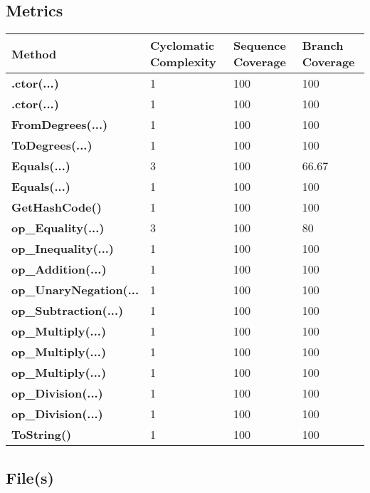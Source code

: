 \documentclass[a4paper,10pt]{article}
\begin{document}
\subsection{Metrics}
\begin{longtable}[l]{|l|l|l|l|}
\hline
\textbf{Method} & \textbf{Cyclomatic Complexity} & \textbf{Sequence Coverage} & \textbf{Branch Coverage}\\
\hline
\textbf{.ctor(...)} & 1 & 100 & 100\\
\hline
\textbf{.ctor(...)} & 1 & 100 & 100\\
\hline
\textbf{FromDegrees(...)} & 1 & 100 & 100\\
\hline
\textbf{ToDegrees(...)} & 1 & 100 & 100\\
\hline
\textbf{Equals(...)} & 3 & 100 & 66.67\\
\hline
\textbf{Equals(...)} & 1 & 100 & 100\\
\hline
\textbf{GetHashCode()} & 1 & 100 & 100\\
\hline
\textbf{op\_Equality(...)} & 3 & 100 & 80\\
\hline
\textbf{op\_Inequality(...)} & 1 & 100 & 100\\
\hline
\textbf{op\_Addition(...)} & 1 & 100 & 100\\
\hline
\textbf{op\_UnaryNegation(...} & 1 & 100 & 100\\
\hline
\textbf{op\_Subtraction(...)} & 1 & 100 & 100\\
\hline
\textbf{op\_Multiply(...)} & 1 & 100 & 100\\
\hline
\textbf{op\_Multiply(...)} & 1 & 100 & 100\\
\hline
\textbf{op\_Multiply(...)} & 1 & 100 & 100\\
\hline
\textbf{op\_Division(...)} & 1 & 100 & 100\\
\hline
\textbf{op\_Division(...)} & 1 & 100 & 100\\
\hline
\textbf{ToString()} & 1 & 100 & 100\\
\hline
\end{longtable}
\subsection{File(s)}
\end{document}
